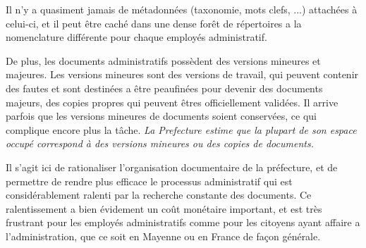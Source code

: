 Il n'y a quasiment jamais de métadonnées (taxonomie, mots clefs, ...) attachées à celui-ci, et il peut être caché dans une dense forêt de répertoires a la nomenclature différente pour chaque employés administratif.
\\
\par
De plus, les documents administratifs possèdent des versions mineures et majeures.
Les versions mineures sont des versions de travail, qui peuvent contenir des fautes et sont destinées a être peaufinées pour devenir des documents majeurs, des copies propres qui peuvent êtres officiellement validées.
Il arrive parfois que les versions mineures de documents soient conservées, ce qui complique encore plus la tâche.
\emph{La Prefecture estime que la plupart de son espace occupé correspond à des versions mineures ou des copies de documents.}
\\
\par
Il s'agit ici de rationaliser l'organisation documentaire de la préfecture, et de permettre de rendre plus efficace le processus administratif qui est considérablement ralenti par la recherche constante des documents.
Ce ralentissement a bien évidement un coût monétaire important, et est très frustrant pour les employés administratifs comme pour les citoyens ayant affaire a l'administration, que ce soit en Mayenne ou en France de façon générale. 

